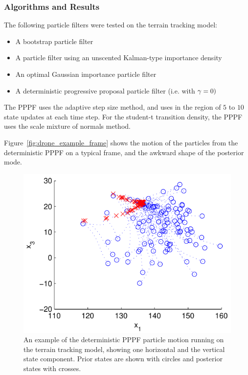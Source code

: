 \documentclass{article}
\begin{document}
\subsubsection{Algorithms and Results}

The following particle filters were tested on the terrain tracking model:
\begin{itemize}
  \item A bootstrap particle filter
  \item A particle filter using an unscented Kalman-type importance density
  \item An optimal Gaussian importance particle filter
  \item A deterministic progressive proposal particle filter (i.e. with $\gamma=0)$
\end{itemize}

The PPPF uses the adaptive step size method, and uses in the region of $5$ to $10$ state updates at each time step. For the student-t transition density, the PPPF uses the scale mixture of normals method.

Figure~\ref{fig:drone_example_frame} shows the motion of the particles from the deterministic PPPF on a typical frame, and the awkward shape of the posterior mode.
%
\begin{figure}
\centering
\includegraphics[width=0.7\columnwidth]{drone_example_frame_deter.pdf}
\caption{An example of the deterministic PPPF particle motion running on the terrain tracking model, showing one horizontal and the vertical state component. Prior states are shown with circles and posterior states with crosses.}
\label{fig:drone_example_frame_deterministic}
\end{figure}
\end{document}
